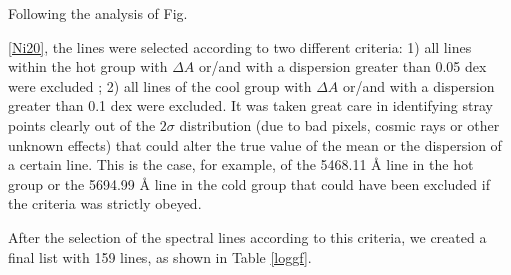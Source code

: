 \documentclass[dvips,12pt,a4paper]{report}
\begin{document}
{Following the analysis of Fig. {\ref{Ni20}, the lines were selected according to two different criteria: 1) all lines within the hot group with $\Delta A$ or/and with a dispersion greater than 0.05 dex were excluded ; 2) all lines of the cool group with $\Delta A$ or/and  with a dispersion greater than 0.1 dex were excluded. It was taken great care in identifying stray points clearly out of the $2\sigma$ distribution (due to bad pixels, cosmic rays or other unknown effects) that could alter the true value of the mean or the dispersion of a certain line. This is the case, for example, of the 5468.11 \AA{} line in the hot group or the 5694.99 \AA{} line in the cold group that could have been excluded if the criteria was strictly obeyed. 

After the selection of the spectral lines according to this criteria, we created a final list with 159 lines, as shown in Table \ref{loggf}. 

}}
\end{document}

